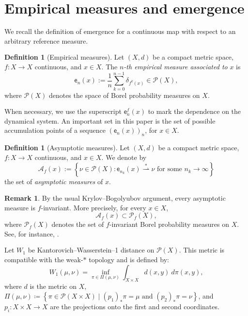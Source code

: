 \documentclass[12pt,a4paper,twoside]{article}
\theoremstyle{plain}
\theoremstyle{definition}
\newtheorem{definition}[theorem]{Definition}
\newtheorem{remark}[theorem]{Remark}
\newcommand{\cA}{{\mathcal A}}
\newcommand{\cP}{{\mathcal P}}
\newcommand{\emp}{\mathsf e}
\newcommand{\Wone}{W_1}
\newcommand{\wto}{\overset{*}{\rightharpoonup}}
\begin{document}
\section{Empirical measures and emergence}
	
	We recall the definition of emergence for a
	continuous map with respect to an arbitrary reference measure.
	
	\begin{definition}[Empirical measures]
		Let $(X,d)$ be a compact metric space, $f\colon X\to X$ continuous,
		and $x\in X$.
		The \textit{$n$-th empirical measure associated to} $x$ is
		\[
		\emp_n(x) := \frac1n \sum_{k=0}^{n-1} \delta_{f^k(x)}
		\in \cP(X),
		\]
		where $\cP(X)$ denotes the space of Borel probability measures on $X$. 
	\end{definition}

When necessary, we use the superscript $\emp_n^f(x)$ to mark the dependence on the dynamical system. An important set in this paper is the set of possible accumulation points of a sequence $(\emp_n(x))_n$, for $x\in X$.

    \begin{definition}[Asymptotic measures]
	Let $(X,d)$ be a compact metric space, $f\colon X\to X$ continuous,
	and $x\in X$. We denote by
	\[
	\cA_f(x)
	:=
	\left\{
		\nu\in\cP(X):
		\emp_{n_k}(x)\wto\nu
		\text{ for some }n_k\to\infty
		\right\}
	\]
	the set of \emph{asymptotic measures} of \(x\).
\end{definition}

\begin{remark}\label{rem:asymptotic-invariant}
	By the usual Krylov--Bogolyubov argument, every asymptotic measure is \(f\)-invariant. More precisely, for every \(x\in X\),
	\[
	\cA_f(x)\subset\cP_f(X),
	\]
	where \(\cP_f(X)\) denotes the set of \(f\)-invariant Borel probability measures on \(X\). See, for instance, \cite[Lemma~2.2.4]{viana2016foundations}.
\end{remark}


    Let $\Wone$ be Kantorovich--Wasserstein--1 distance on $\cP(X)$. This metric is compatible with the weak-$\ast$ topology and is defined by:
	$$
	\Wone(\mu,\nu)=\inf_{\pi \in \Pi(\mu,\nu)}\int_{X\times X} d(x,y) \ d\pi(x,y),
	$$
	where $d$ is the metric on $X$, $\Pi(\mu,\nu)\coloneqq \left\{\pi \in \mathcal{P}(X\times X) \mid (p_{1})_{\ast}\pi=\mu \text{ and }(p_{2})_{\ast}\pi=\nu\right\}$, and $p_{i}\colon X\times X \to X$ are the projections onto the first and second coordinates.
\end{document}
